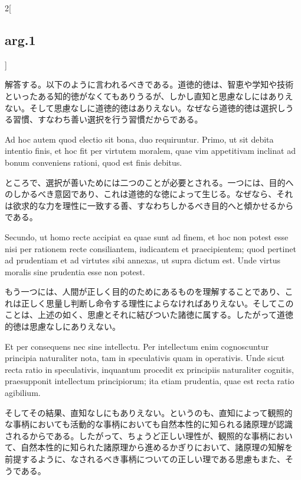 \documentclass[paper=a4paper,fontsize=10pt,jafontsize=9pt,titlepage]{jlreq}
\begin{document}
\begin{paracol}{2}[\subsection{arg.1}]
\switchcolumn

解答する。以下のように言われるべきである。道徳的徳は、智恵や学知や技術
といったある知的徳がなくてもありうるが、しかし直知と思慮なしにはありえ
ない。そして思慮なしに道徳的徳はありえない。なぜなら道徳的徳は選択しう
る習慣、すなわち善い選択を行う習慣だからである。

\switchcolumn*

Ad hoc autem quod electio sit bona, duo requiruntur. Primo, ut sit
debita intentio finis, et hoc fit per virtutem moralem, quae vim
appetitivam inclinat ad bonum conveniens rationi, quod est finis
debitus.

\switchcolumn

ところで、選択が善いためには二つのことが必要とされる。一つには、目的へ
のしかるべき意図であり、これは道徳的な徳によって生じる。なぜなら、それ
は欲求的な力を理性に一致する善、すなわちしかるべき目的へと傾かせるから
である。

\switchcolumn*

Secundo, ut homo recte accipiat ea quae sunt ad finem, et hoc non
potest esse nisi per rationem recte consiliantem, iudicantem et
praecipientem; quod pertinet ad prudentiam et ad virtutes sibi
annexas, ut supra dictum est. Unde virtus moralis sine prudentia esse
non potest.

\switchcolumn

もう一つには、人間が正しく目的のためにあるものを理解することであり、こ
れは正しく思量し判断し命令する理性によらなければありえない。そしてこの
ことは、上述の如く、思慮とそれに結びついた諸徳に属する。したがって道徳
的徳は思慮なしにありえない。

\switchcolumn*

Et per consequens nec sine intellectu. Per intellectum enim
cognoscuntur principia naturaliter nota, tam in speculativis quam in
operativis. Unde sicut recta ratio in speculativis, inquantum procedit
ex principiis naturaliter cognitis, praesupponit intellectum
principiorum; ita etiam prudentia, quae est recta ratio agibilium.

\switchcolumn

そしてその結果、直知なしにもありえない。というのも、直知によって観照的
な事柄においても活動的な事柄においても自然本性的に知られる諸原理が認識
されるからである。したがって、ちょうど正しい理性が、観照的な事柄におい
て、自然本性的に知られた諸原理から進めるかぎりにおいて、諸原理の知解を
前提するように、なされるべき事柄についての正しい理である思慮もまた、そ
うである。

\switchcolumn*[\subsection{ad.1}]


\end{paracol}
\end{document}
